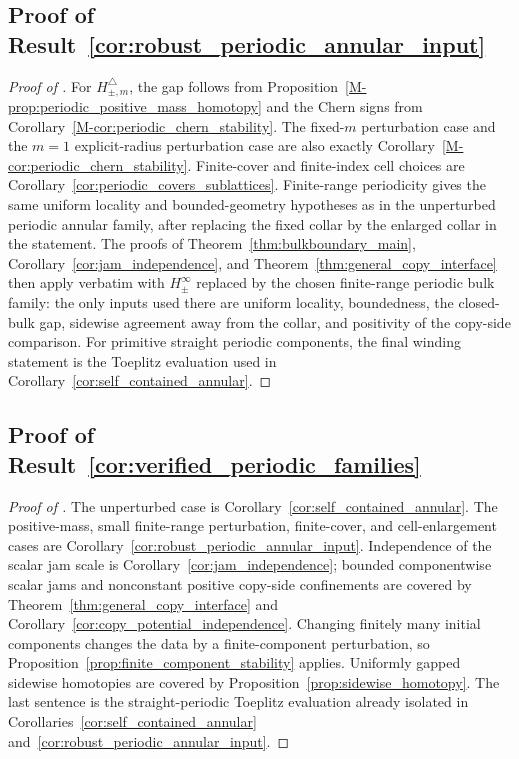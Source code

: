 \documentclass[11pt]{article}
\numberwithin{equation}{section}
\theoremstyle{definition}
\theoremstyle{remark}
\begin{document}
\subsection{Proof of Result~\ref{cor:robust_periodic_annular_input}}\label{app:proof:cor:robust_periodic_annular_input}
\begin{proof}[Proof of ]
For \(H_{\pm,m}^\triangle\), the gap follows from
Proposition~\ref{M-prop:periodic_positive_mass_homotopy} and the Chern signs from
Corollary~\ref{M-cor:periodic_chern_stability}. The fixed-\(m\) perturbation case and the
\(m=1\) explicit-radius perturbation case are also exactly
Corollary~\ref{M-cor:periodic_chern_stability}. Finite-cover and finite-index cell choices are
Corollary~\ref{cor:periodic_covers_sublattices}. Finite-range periodicity gives the
same uniform locality and bounded-geometry hypotheses as in the unperturbed periodic annular
family, after replacing the fixed collar by the enlarged collar in the statement. The proofs of
Theorem~\ref{thm:bulkboundary_main}, Corollary~\ref{cor:jam_independence}, and
Theorem~\ref{thm:general_copy_interface} then apply verbatim with \(H_\pm^\infty\) replaced by the
chosen finite-range periodic bulk family: the only inputs used there are uniform locality,
boundedness, the closed-bulk gap, sidewise agreement away from the collar, and positivity of the
copy-side comparison. For primitive straight periodic components, the final winding statement is
the Toeplitz evaluation used in Corollary~\ref{cor:self_contained_annular}.
\end{proof}

\subsection{Proof of Result~\ref{cor:verified_periodic_families}}\label{app:proof:cor:verified_periodic_families}
\begin{proof}[Proof of ]
The unperturbed case is Corollary~\ref{cor:self_contained_annular}. The positive-mass,
small finite-range perturbation, finite-cover, and cell-enlargement cases are
Corollary~\ref{cor:robust_periodic_annular_input}. Independence
of the scalar jam scale is Corollary~\ref{cor:jam_independence}; bounded componentwise scalar jams
and nonconstant positive copy-side confinements are covered by
Theorem~\ref{thm:general_copy_interface} and
Corollary~\ref{cor:copy_potential_independence}. Changing finitely many initial components changes
the data by a finite-component perturbation, so Proposition~\ref{prop:finite_component_stability}
applies. Uniformly gapped sidewise homotopies are covered by
Proposition~\ref{prop:sidewise_homotopy}. The last sentence is the straight-periodic Toeplitz
evaluation already isolated in Corollaries~\ref{cor:self_contained_annular}
and~\ref{cor:robust_periodic_annular_input}.
\end{proof}
\end{document}

